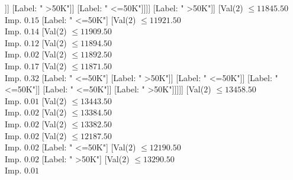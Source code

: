 \documentclass[margin=10pt]{standalone}
\begin{document}
\begin{forest}
																															[Val($2$) $ \leq 11700.50$ \\ Imp. $0.02$
																																[Val($2$) $ \leq 11698.50$ \\ Imp. $0.19$
																																	[Val($2$) $ \leq 11677.50$ \\ Imp. $0.02$
																																		[Label: " >50K"]
																																		[Val($2$) $ \leq 11687.50$ \\ Imp. $0.25$
																																			[Label: " <=50K"]
																																			[Label: " >50K"]]]
																																	[Label: " >50K"]]
																																[Label: " <=50K"]]]]
																													[Label: " >50K"]]
																												[Val($2$) $ \leq 11845.50$ \\ Imp. $0.15$
																													[Label: " <=50K"]
																													[Val($2$) $ \leq 11921.50$ \\ Imp. $0.14$
																														[Val($2$) $ \leq 11909.50$ \\ Imp. $0.12$
																															[Val($2$) $ \leq 11894.50$ \\ Imp. $0.02$
																																[Val($2$) $ \leq 11892.50$ \\ Imp. $0.17$
																																	[Val($2$) $ \leq 11871.50$ \\ Imp. $0.32$
																																		[Label: " <=50K"]
																																		[Label: " >50K"]]
																																	[Label: " <=50K"]]
																																[Label: " <=50K"]]
																															[Label: " <=50K"]]
																														[Label: " >50K"]]]]]
																										[Val($2$) $ \leq 13458.50$ \\ Imp. $0.01$
																											[Val($2$) $ \leq 13443.50$ \\ Imp. $0.02$
																												[Val($2$) $ \leq 13384.50$ \\ Imp. $0.02$
																													[Val($2$) $ \leq 13382.50$ \\ Imp. $0.02$
																														[Val($2$) $ \leq 12187.50$ \\ Imp. $0.02$
																															[Label: " <=50K"]
																															[Val($2$) $ \leq 12190.50$ \\ Imp. $0.02$
																																[Label: " >50K"]
																																[Val($2$) $ \leq 13290.50$ \\ Imp. $0.01$

\end{forest}
\end{document}
